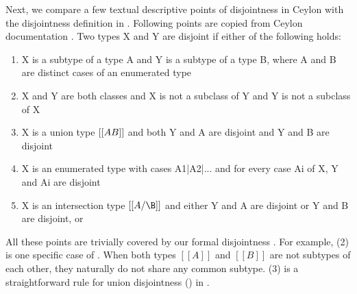 Next, we compare a few textual descriptive points of disjointness in Ceylon with
the disjointness definition in \cal. Following points are copied from Ceylon
documentation \cite{}. Two types X and Y are disjoint if either of the following holds:

\begin{enumerate}
  \item{X is a subtype of a type A and Y is a subtype of a type B, where A and B are distinct cases of an enumerated type}
  \item{X and Y are both classes and X is not a subclass of Y and Y is not a subclass of X}
  \item{X is a union type $[[A \/ B]]$ and both Y and A are disjoint and Y and B are disjoint}
  \item{X is an enumerated type with cases A1|A2|... and for every case Ai of X, Y and Ai are disjoint}
  \item{X is an intersection type $[[A/\B]]$ and either Y and A are disjoint or Y and B are disjoint, or}
\end{enumerate}

\noindent All these points are trivially covered by our formal disjointness .
For example, (2) is one specific case of . When both types $[[A]]$ and
$[[B]]$ are not subtypes of each other, they naturally do not share any common subtype.
(3) is a straightforward rule for union disjointness (\rref{}) in \cal.

